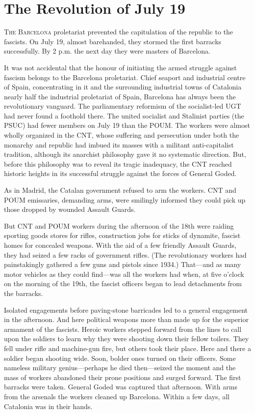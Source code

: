 \chapter{The Revolution of July 19}

\textsc{The Barcelona} proletariat prevented the capitulation of the republic to the fascists. On July 19, almost barehanded, they stormed the first barracks successfully. By 2 p.m\@. the next day they were masters of Barcelona.

It was not accidental that the honour of initiating the armed struggle against fascism belongs to the Barcelona proletariat. Chief seaport and industrial centre of Spain, concentrating in it and the surrounding industrial towns of Catalonia nearly half the industrial proletariat of Spain, Barcelona has always been the revolutionary vanguard. The parliamentary reformism of the socialist-led UGT had never found a foothold there. The united socialist and Stalinist parties (the PSUC) had fewer members on July 19 than the POUM. The workers were almost wholly organized in the CNT, whose suffering and persecution under both the monarchy and republic had imbued its masses with a militant anti-capitalist tradition, although its anarchist philosophy gave it no systematic direction. But, before this philosophy was to reveal its tragic inadequacy, the CNT reached historic heights in its successful struggle against the forces of General Goded.

As in Madrid, the Catalan government refused to arm the workers. CNT and POUM emissaries, demanding arms, were smilingly informed they could pick up those dropped by wounded Assault Guards.

But CNT and POUM workers during the afternoon of the 18th were raiding sporting goods stores for rifles, construction jobs for sticks of dynamite, fascist homes for concealed weapons. With the aid of a few friendly Assault Guards, they had seized a few racks of government rifles. (The revolutionary workers had painstakingly gathered a few guns and pistols since 1934.) That---and as many motor vehicles as they could find---was all the workers had when, at five o’clock on the morning of the 19th, the fascist officers began to lead detachments from the barracks.

Isolated engagements before paving-stone barricades led to a general engagement in the afternoon. And here political weapons more than made up for the superior armament of the fascists. Heroic workers stepped forward from the lines to call upon the soldiers to learn why they were shooting down their fellow toilers. They fell under rifle and machine-gun fire, but others took their place. Here and there a soldier began shooting wide. Soon, bolder ones turned on their officers. Some nameless military genius---perhaps he died then---seized the moment and the mass of workers abandoned their prone positions and surged forward. The first barracks were taken. General Goded was captured that afternoon. With arms from the arsenals the workers cleaned up Barcelona. Within a few days, all Catalonia was in their hands.

